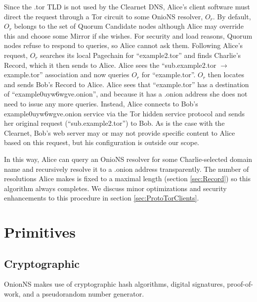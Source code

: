 Since the .tor TLD is not used by the Clearnet DNS, Alice's client software must direct the request through a Tor circuit to some OnioNS resolver, $ O_{r} $. By default, $ O_{r} $ belongs to the set of Quorum Candidate nodes although Alice may override this and choose some Mirror if she wishes. For security and load reasons, Quorum nodes refuse to respond to queries, so Alice cannot ask them. Following Alice's request, $ O_{r} $ searches its local Pagechain for ``example2.tor'' and finds Charlie's Record, which it then sends to Alice. Alice sees the ``sub.example2.tor $ \rightarrow $ example.tor'' association and now queries $ O_{r} $ for ``example.tor''. $ O_{r} $ then locates and sends Bob's Record to Alice. Alice sees that ``example.tor'' has a destination of ``example0uyw6wgve.onion'', and because it has a .onion address she does not need to issue any more queries. Instead, Alice connects to Bob's example0uyw6wgve.onion service via the Tor  hidden service protocol and sends her original request (``sub.example2.tor'') to Bob. As is the case with the Clearnet, Bob's web server may or may not provide specific content to Alice based on this request, but his configuration is outside our scope.

In this way, Alice can query an OnioNS resolver for some Charlie-selected domain name and recursively resolve it to a .onion address transparently. The number of resolutions Alice makes is fixed to a maximal length (section \ref{sec:Record}) so this algorithm always completes. We discuss minor optimizations and security enhancements to this procedure in section \ref{sec:ProtoTorClients}.

\section{Primitives}

\subsection{Cryptographic}

OnionNS makes use of cryptographic hash algorithms, digital signatures, proof-of-work, and a pseudorandom number generator.

